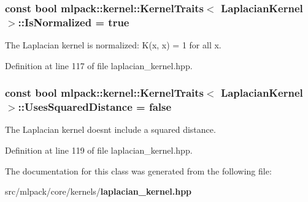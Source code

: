 \subsubsection[{Is\+Normalized}]{\setlength{\rightskip}{0pt plus 5cm}const bool {\bf mlpack\+::kernel\+::\+Kernel\+Traits}$<$ {\bf Laplacian\+Kernel} $>$\+::Is\+Normalized = true\hspace{0.3cm}{\ttfamily [static]}}\label{classmlpack_1_1kernel_1_1KernelTraits_3_01LaplacianKernel_01_4_a3057882456025fdf59e196dc1eeeff93}


The Laplacian kernel is normalized\+: K(x, x) = 1 for all x. 



Definition at line 117 of file laplacian\+\_\+kernel.\+hpp.

\subsubsection[{Uses\+Squared\+Distance}]{\setlength{\rightskip}{0pt plus 5cm}const bool {\bf mlpack\+::kernel\+::\+Kernel\+Traits}$<$ {\bf Laplacian\+Kernel} $>$\+::Uses\+Squared\+Distance = false\hspace{0.3cm}{\ttfamily [static]}}\label{classmlpack_1_1kernel_1_1KernelTraits_3_01LaplacianKernel_01_4_a0cd108cbdbd6d26afdbf9ba2ce89e0d6}


The Laplacian kernel doesn\textquotesingle{}t include a squared distance. 



Definition at line 119 of file laplacian\+\_\+kernel.\+hpp.



The documentation for this class was generated from the following file\+:\begin{DoxyCompactItemize}
\item 
src/mlpack/core/kernels/{\bf laplacian\+\_\+kernel.\+hpp}\end{DoxyCompactItemize}
